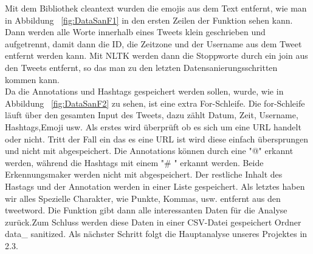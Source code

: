 
	Mit dem Bibliothek cleantext wurden die emojis aus dem Text entfernt, wie man in Abbildung ~\ref{fig:DataSanF1} in den ersten Zeilen der Funktion sehen kann.
	Dann werden alle Worte innerhalb eines Tweets klein geschrieben und aufgetrennt, damit dann  die ID, die Zeitzone und der Username aus dem Tweet entfernt 
	werden kann. Mit NLTK werden dann die Stoppworte durch ein join aus den Tweets entfernt, so das man zu den letzten Datensanierungsschritten kommen kann.\\
	 
	
	Da die Annotations und Hashtags gespeichert werden sollen, wurde, wie in Abbildung ~\ref{fig:DataSanF2} zu sehen, ist eine extra For-Schleife. Die for-Schleife läuft über 
	den gesamten Input des Tweets, dazu zählt Datum, Zeit, Username, Hashtags,Emoji usw. Als erstes wird überprüft ob es sich um eine URL handelt oder nicht. Tritt der Fall 
	ein das es eine URL ist wird diese einfach übersprungen und nicht mit abgespeichert. Die Annotations können durch eine "@" erkannt werden, während die Hashtags mit 
	einem "\# " erkannt werden. Beide Erkennungsmaker werden nicht mit abgespeichert. Der restliche Inhalt des Hastags und der Annotation werden in einer Liste gespeichert. 
	Als letztes haben wir alles Spezielle Charakter, wie Punkte, Kommas, usw. entfernt aus den tweetword. Die Funktion gibt dann alle interessanten Daten für die Analyse 
	zurück.Zum Schluss werden diese Daten in einer CSV-Datei gespeichert Ordner data\_ sanitized.  
	Als nächster Schritt folgt die Hauptanalyse unseres Projektes in 2.3. 
	
	

